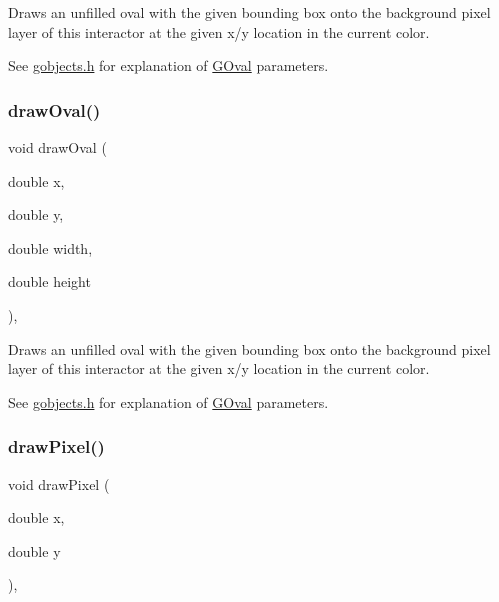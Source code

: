 Draws an unfilled oval with the given bounding box onto the background pixel layer of this interactor at the given x/y location in the current color. 

See \mbox{\hyperlink{gobjects_8h_source}{gobjects.\+h}} for explanation of \mbox{\hyperlink{classsgl_1_1GOval}{G\+Oval}} parameters. \mbox{\label{classsgl_1_1GDrawingSurface_aa5b1cf902e578907da3c63060686354e}} 
\subsubsection{\texorpdfstring{draw\+Oval()}{drawOval()}\hspace{0.1cm}{\footnotesize\ttfamily [2/2]}}
{\footnotesize\ttfamily void draw\+Oval (\begin{DoxyParamCaption}\item[{double}]{x,  }\item[{double}]{y,  }\item[{double}]{width,  }\item[{double}]{height }\end{DoxyParamCaption})\hspace{0.3cm}{\ttfamily [virtual]}, {\ttfamily [inherited]}}



Draws an unfilled oval with the given bounding box onto the background pixel layer of this interactor at the given x/y location in the current color. 

See \mbox{\hyperlink{gobjects_8h_source}{gobjects.\+h}} for explanation of \mbox{\hyperlink{classsgl_1_1GOval}{G\+Oval}} parameters. \mbox{\label{classsgl_1_1GDrawingSurface_a0c1e2923d8d163d62d0896d8c5cfa191}} 
\subsubsection{\texorpdfstring{draw\+Pixel()}{drawPixel()}\hspace{0.1cm}{\footnotesize\ttfamily [1/3]}}
{\footnotesize\ttfamily void draw\+Pixel (\begin{DoxyParamCaption}\item[{double}]{x,  }\item[{double}]{y }\end{DoxyParamCaption})\hspace{0.3cm}{\ttfamily [virtual]}, {\ttfamily [inherited]}}



